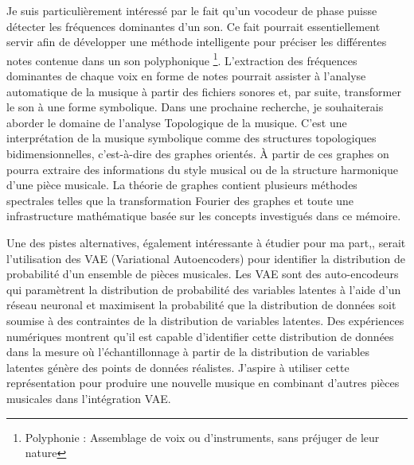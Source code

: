 Je suis particulièrement intéressé par le fait qu’un vocodeur de phase puisse détecter les fréquences dominantes d'un son. Ce fait pourrait essentiellement servir afin de développer une méthode intelligente pour préciser les différentes notes contenue dans un son polyphonique \footnote{Polyphonie : Assemblage de voix ou d'instruments, sans préjuger de leur nature}. L'extraction des fréquences dominantes de chaque voix en forme de notes pourrait assister à l'analyse automatique de la musique à partir des fichiers sonores et, par suite, transformer le son à une forme symbolique. Dans une prochaine recherche, je souhaiterais aborder le domaine de l'analyse Topologique de la musique. C’est une interprétation de la musique symbolique comme des structures topologiques bidimensionnelles, c'est-à-dire des graphes orientés. À partir de ces graphes on pourra extraire des informations du style musical ou de la structure harmonique d'une pièce musicale. La théorie de graphes contient plusieurs méthodes spectrales telles que la transformation Fourier des graphes et toute une infrastructure mathématique basée sur les concepts investigués dans ce mémoire.

Une  des pistes alternatives, également intéressante à étudier pour ma part,, serait l’utilisation des VAE (Variational Autoencoders) pour identifier la distribution de probabilité d’un ensemble de pièces musicales. Les VAE sont des auto-encodeurs qui paramètrent la distribution de probabilité des variables latentes à l'aide d'un réseau neuronal et maximisent la probabilité que la distribution de données soit soumise à des contraintes de la distribution de variables latentes. Des expériences numériques montrent qu’il est capable d’identifier cette distribution de données dans la mesure où l’échantillonnage à partir de la distribution de variables latentes génère des points de données réalistes. J'aspire à utiliser cette représentation pour produire une nouvelle musique en combinant d'autres pièces musicales dans l'intégration VAE.

